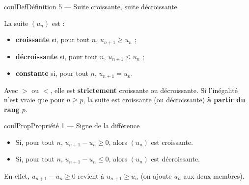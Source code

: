 \documentclass[11pt,a4paper]{article}
\makeatletter
\renewcommand{\le}{\leqslant}
\renewcommand{\ge}{\geqslant}
\newcounter{lycee@signet}
\newcommand{\signet}[3][]{\stepcounter{lycee@signet}%
  \edef\lycee@dest{\if\relax\detokenize{#1}\relax
    signet.\arabic{lycee@signet}\else#1\fi}%
  \hypertarget{\lycee@dest}{}\bookmark[level=#2,dest=\lycee@dest]{#3}}
\newenvironment{definitionbox}[1][Définition]%
  {\begin{boitecours}[phantom={\signet{2}{#1}}]{coulDef}{#1}}{\end{boitecours}}
\newenvironment{proprietebox}[1][Propriété]%
  {\begin{boitecours}[phantom={\signet{2}{#1}}]{coulProp}{#1}}{\end{boitecours}}
\makeatother
\begin{document}
\begin{definitionbox}[Définition 5 --- Suite croissante, suite décroissante]
\begin{minipage}[c]{0.60\linewidth}\raggedright
La suite $(u_{n})$ est :
\begin{itemize}
  \item \textbf{croissante} si, pour tout $n$, $u_{n+1}\ge u_{n}$ ;
  \item \textbf{décroissante} si, pour tout $n$, $u_{n+1}\le u_{n}$ ;
  \item \textbf{constante} si, pour tout $n$, $u_{n+1}=u_{n}$.
\end{itemize}
Avec $>$ ou $<$, elle est \textbf{strictement} croissante ou décroissante. Si l'inégalité
n'est vraie que pour $n\ge p$, la suite est croissante (ou décroissante) \textbf{à
partir du rang $p$}.
\end{minipage}\hfill
\begin{minipage}[c]{0.38\linewidth}\centering
{}\hspace{4mm}%
\end{minipage}
\end{definitionbox}

\begin{proprietebox}[Propriété 1 --- Signe de la différence]
\begin{itemize}
  \item Si, pour tout $n$, $u_{n+1}-u_{n}\ge 0$, alors $(u_{n})$ est croissante.
  \item Si, pour tout $n$, $u_{n+1}-u_{n}\le 0$, alors $(u_{n})$ est décroissante.
\end{itemize}
En effet, $u_{n+1}-u_{n}\ge 0$ revient à $u_{n+1}\ge u_{n}$ (on ajoute $u_{n}$ aux deux
membres).
\end{proprietebox}
\end{document}
